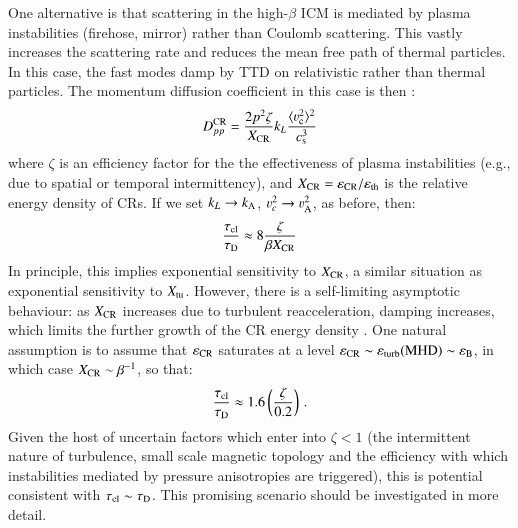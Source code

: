 \documentclass[fleqn,usenatbib,useAMS]{mnras}
\newcommand{\eps}{\varepsilon}
\begin{document}
One alternative is that scattering in the high-$\beta$ ICM is mediated by plasma instabilities (firehose, mirror) rather than Coulomb scattering. This vastly increases the scattering rate and reduces the mean free path of thermal particles. In this case, the fast modes damp by TTD on relativistic rather than thermal particles. The momentum diffusion coefficient in this case is then \citep{brunetti11, miniati15}:
\begin{equation}
D_{pp}^{\rm CR} = \frac{2 p^{2} \zeta}{X_{\rm CR}} k_L \frac{\langle \varv_{\rm c}^{2} \rangle^{2}}{c_{\rm s}^{3}}
\end{equation}
where $\zeta$ is an efficiency factor for the the effectiveness of plasma instabilities (e.g., due to spatial or temporal intermittency), and $X_{\rm CR}=\eps_{\rm CR}/\eps_{\rm th}$ is the relative energy density of CRs. If we set $k_L \rightarrow k_{\rm A}$, $\varv_{c}^{2} \rightarrow \varv_{\rm A}^{2}$, as before, then: 
\begin{equation}
\frac{\tau_{\rm cl}}{\tau_{\rm D}} \approx 8 \frac{\zeta}{\beta X_{\rm CR}}
\end{equation}
In principle, this implies exponential sensitivity to $X_{\rm CR}$, a similar situation as exponential sensitivity to $X_{\rm tu}$. However, there is a self-limiting asymptotic behaviour: as $X_{\rm CR}$ increases due to turbulent reacceleration, damping increases, which limits the further growth of the CR energy density \citep{brunetti11}. One natural assumption is to assume that $\eps_{\rm CR}$ saturates at a level $\eps_{\rm CR} \sim \eps_{\rm turb} ({\rm MHD}) \sim \eps_{\rm B}$, in which case $X_{\rm CR} \sim \beta^{-1}$, so that: 
\begin{equation}
\frac{\tau_{\rm cl}}{\tau_{\rm D}} \approx 1.6 \left(\frac{\zeta}{0.2}\right)\,.
\label{eqn:ratios_CR_damp} 
\end{equation}
Given the host of uncertain factors which enter into $\zeta < 1$ (the intermittent nature of turbulence, small scale magnetic topology and the efficiency with which instabilities mediated by pressure anisotropies are triggered), this is potential consistent with $\tau_{\rm cl} \sim \tau_{\rm D}$. This promising scenario should be investigated in more detail. 
\end{document}
